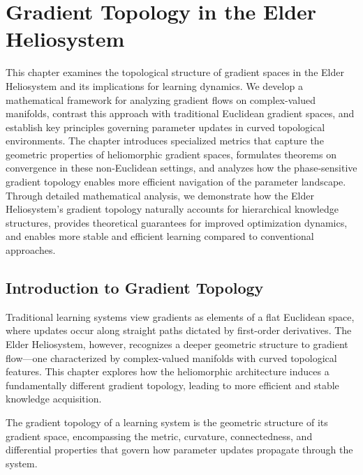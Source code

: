 \chapter{Gradient Topology in the Elder Heliosystem}

\begin{tcolorbox}[colback=PureBlue!5!white,colframe=PureBlue!75!black,title=Chapter Summary]
This chapter examines the topological structure of gradient spaces in the Elder Heliosystem and its implications for learning dynamics. We develop a mathematical framework for analyzing gradient flows on complex-valued manifolds, contrast this approach with traditional Euclidean gradient spaces, and establish key principles governing parameter updates in curved topological environments. The chapter introduces specialized metrics that capture the geometric properties of heliomorphic gradient spaces, formulates theorems on convergence in these non-Euclidean settings, and analyzes how the phase-sensitive gradient topology enables more efficient navigation of the parameter landscape. Through detailed mathematical analysis, we demonstrate how the Elder Heliosystem's gradient topology naturally accounts for hierarchical knowledge structures, provides theoretical guarantees for improved optimization dynamics, and enables more stable and efficient learning compared to conventional approaches.
\end{tcolorbox}

\section{Introduction to Gradient Topology}

Traditional learning systems view gradients as elements of a flat Euclidean space, where updates occur along straight paths dictated by first-order derivatives. The Elder Heliosystem, however, recognizes a deeper geometric structure to gradient flow—one characterized by complex-valued manifolds with curved topological features. This chapter explores how the heliomorphic architecture induces a fundamentally different gradient topology, leading to more efficient and stable knowledge acquisition.

\begin{definition}
The gradient topology of a learning system is the geometric structure of its gradient space, encompassing the metric, curvature, connectedness, and differential properties that govern how parameter updates propagate through the system.
\end{definition}

